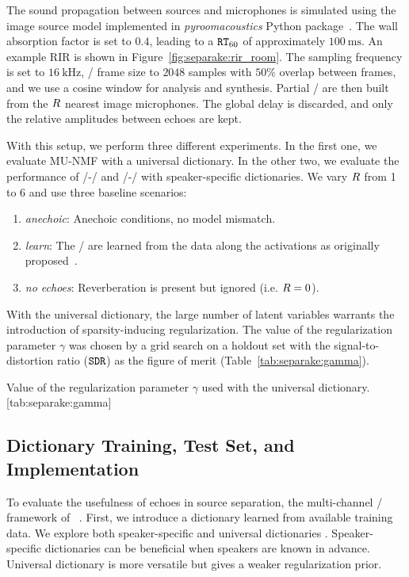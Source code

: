\mynewline
The sound propagation between sources and microphones is simulated using the
image source model implemented in \textit{pyroomacoustics} Python package~.
The wall absorption factor is set to $0.4$, leading to a $\mathtt{RT}_{60}$ of approximately $\SI{100}{\ms}$.
An example RIR is shown in Figure~\ref{fig:separake:rir_room}.
The sampling frequency is set to $\SI{16}{\kHz}$, \STFT/ frame size to $2048$ samples with $50\%$ overlap between frames, and we use a cosine window for analysis and synthesis.
Partial \RTFs/ are then built from the $R$ nearest image microphones.
The global delay is discarded, and only the relative amplitudes between echoes are kept.

\mynewline
With this setup, we perform three different experiments.
In the first one, we evaluate MU-NMF with a universal dictionary.
In the other two, we evaluate the performance of \MU/-\NMF/ and \EM/-\NMF/ with speaker-specific dictionaries.
We vary $R$ from 1 to 6 and use three baseline scenarios:
\begin{enumerate}
\item \textit{anechoic}: Anechoic conditions, no model mismatch.
\item \textit{learn}: The \RTFs/ are learned from the data along the activations as originally proposed~.
\item \textit{no echoes}: Reverberation is present but ignored (i.e. $R=0$).
\end{enumerate}
With the universal dictionary, the large number of latent variables warrants the introduction of sparsity-inducing regularization.
The value of the regularization parameter $\gamma$ was chosen by a grid search on a holdout set with the signal-to-distortion ratio ($\mathtt{SDR}$) as the figure of merit  (Table~\cref{tab:separake:gamma}).

\begin{table}
    \begin{sidecaption}[]{
        Value of the regularization parameter $\gamma$ used with the universal dictionary.
        }[tab:separake:gamma]
        \centering
        \small
        
    \end{sidecaption}
\end{table}


\subsection{Dictionary Training, Test Set, and Implementation}
To evaluate the usefulness of echoes in source separation, the multi-channel \NMF/ framework of \citeauthor{ozerov2010multichannel}~.
First, we introduce a dictionary learned from available training data.
We explore both speaker-specific and universal dictionaries .
Speaker-specific dictionaries can be beneficial when speakers are known in advance.
Universal dictionary is more versatile but gives a weaker regularization prior.


